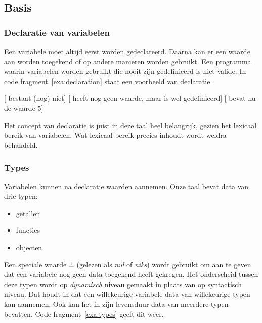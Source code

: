 \subsection{Basis}

\subsubsection{Declaratie van variabelen}

Een variabele moet altijd eerst worden gedeclareerd. Daarna kan er een waarde aan worden toegekend of op andere manieren worden gebruikt. Een programma waarin variabelen worden gebruikt die nooit zijn gedefinieerd is niet valide. In code fragment~\ref{exa:declaration} staat een voorbeeld van declaratie.

\begin{NoBreak}
\codeFragmentCaption
\begin{codelines}
  \codeLine{}[ bestaat (nog) niet]
  [ heeft nog geen waarde, maar is wel gedefinieerd]
  [ bevat nu de waarde 5]
\end{codelines}
\end{NoBreak}

Het concept van declaratie is juist in deze taal heel belangrijk, gezien het lexicaal bereik van variabelen. Wat lexicaal bereik precies inhoudt wordt weldra behandeld.

\subsubsection{Types}
\label{subsec:taal-types}

Variabelen kunnen na declaratie waarden aannemen. Onze taal bevat data van drie typen:
\begin{itemize}
  \item getallen
  \item functies
  \item objecten
\end{itemize}
Een speciale waarde $\nil$ (gelezen als \emph{nul} of \emph{niks}) wordt gebruikt om aan te geven dat een variabele nog geen data toegekend heeft gekregen. Het onderscheid tussen deze typen wordt op \emph{dynamisch} niveau gemaakt in plaats van op syntactisch niveau. Dat houdt in dat een willekeurige variabele data van willekeurige typen kan aannemen. Ook kan het in zijn levensduur data van meerdere typen bevatten. Code fragment~\ref{exa:types} geeft dit weer.

